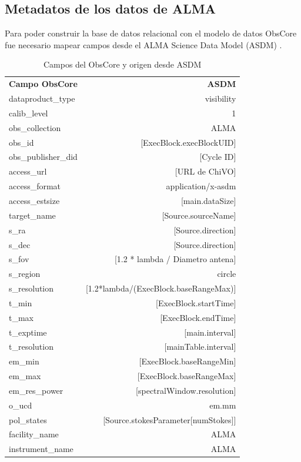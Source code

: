 \subsection{Metadatos de los datos de ALMA}

Para poder construir la base de datos relacional con el modelo de datos ObsCore fue
necesario mapear campos desde el ALMA Science Data Model (ASDM) \cite{viallefond2009sdm}.

\begin{table}[ht]
    \centering
    \caption{Campos del ObsCore y origen desde ASDM}
    \begin{tabular}{lr}
        \textbf{Campo ObsCore} & \textbf{ASDM} \\
        dataproduct\_type      & visibility \\
        calib\_level           & 1 \\
        obs\_collection        & ALMA \\
        obs\_id                & [ExecBlock.execBlockUID] \\
        obs\_publisher\_did    & [Cycle ID] \\
        access\_url            & [URL de ChiVO] \\
        access\_format         & application/x-asdm \\
        access\_estsize        & [main.dataSize] \\
        target\_name           & [Source.sourceName] \\
        s\_ra                  & [Source.direction] \\
        s\_dec                 & [Source.direction] \\
        s\_fov                 & [1.2 * lambda / Diametro antena] \\
        s\_region              & circle \\
        s\_resolution          & [1.2*lambda/(ExecBlock.baseRangeMax)] \\
        t\_min                 & [ExecBlock.startTime] \\
        t\_max                 & [ExecBlock.endTime] \\
        t\_exptime             & [main.interval] \\
        t\_resolution          & [mainTable.interval] \\
        em\_min                & [ExecBlock.baseRangeMin] \\
        em\_max                & [ExecBlock.baseRangeMax] \\
        em\_res\_power         & [spectralWindow.resolution] \\
        o\_ucd                 & em.mm \\
        pol\_states            & [Source.stokesParameter[numStokes]] \\
        facility\_name         & ALMA \\
        instrument\_name       & ALMA \\
    \end{tabular}
    \label{table:obsasdm}
\end{table}


